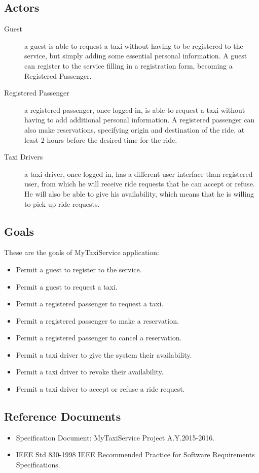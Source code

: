 \subsection{Actors}
\begin{description}
	\item[Guest] a guest is able to request a taxi without having to be registered to the service, but simply adding some essential personal information. A guest can register to the service filling in a registration form, becoming a Registered Passenger.
	\item[Registered Passenger] a registered passenger, once logged in, is able to request a taxi without having to add additional personal information. A registered passenger can also make reservations, specifying origin and destination of the ride, at least 2 hours before the desired time for the ride.
	\item[Taxi Drivers] a taxi driver, once logged in, has a different user interface than registered user, from which he will receive ride requests that he can accept or refuse. He will also be able to give his availability, which means that he is willing to pick up ride requests.
\end{description}
\subsection{Goals}
These are the goals of MyTaxiService application:
\begin{itemize}
	\item Permit a guest to register to the service.
	\item Permit a guest to request a taxi.
	\item Permit a registered passenger to request a taxi.
	\item Permit a registered passenger to make a reservation.
	\item Permit a registered passenger to cancel a reservation.
	\item Permit a taxi driver to give the system their availability.
	\item Permit a taxi driver to revoke their availability.
	\item Permit a taxi driver to accept or refuse a ride request.
\end{itemize}
\subsection{Reference Documents}
\begin{itemize}
	\item Specification Document: MyTaxiService Project A.Y.2015-2016.
	\item IEEE Std 830-1998 IEEE Recommended Practice for Software Requirements Specifications.
\end{itemize}
